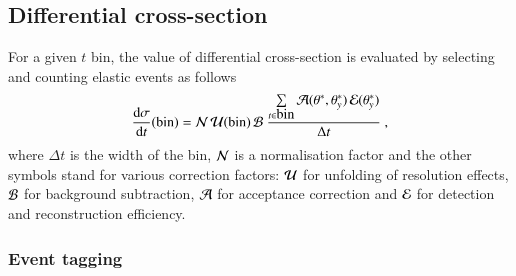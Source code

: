 \subsection{Differential cross-section}
\label{sec:diff cs}

For a given $t$ bin, the value of differential cross-section is evaluated by selecting and counting elastic events as follows
\begin{equation}
{\d\sigma\over \d t}(\hbox{bin}) =
	{\cal N}\, {\cal U}({\rm bin})\, {\cal B}\ 
	{\sum\limits_{t \in \hbox{bin}} {\cal A}(\theta^*, \theta_y^*)\, {\cal E}(\theta_y^*)\over \Delta t}\ ,
\end{equation}
where $\Delta t$ is the width of the bin, ${\cal N}$ is a normalisation factor and the other symbols stand for various correction factors:
 ${\cal U}$ for unfolding of resolution effects, ${\cal B}$ for background subtraction, ${\cal A}$ for acceptance correction and ${\cal E}$ for detection and reconstruction efficiency.


\subsubsection{Event tagging}
\label{sec:tagging}

